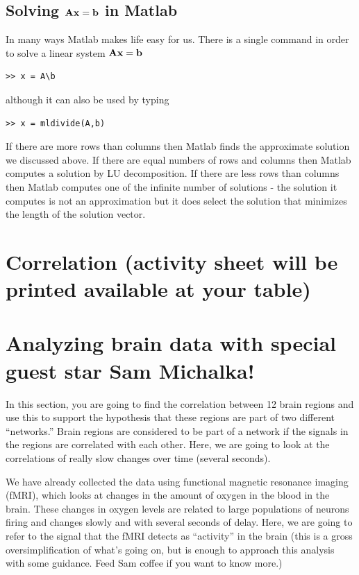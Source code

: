\subsection{Solving $\mathbf{A} \mathbf{x} = \mathbf{b}$ in Matlab}

In many ways Matlab makes life easy for us. There is a single command in order to solve a linear system $\mathbf{A} \mathbf{x} = \mathbf{b}$
\begin{verbatim}
>> x = A\b
\end{verbatim}
although it can also be used by typing
\begin{verbatim}
>> x = mldivide(A,b)
\end{verbatim}
If there are more rows than columns then Matlab finds the approximate solution we discussed above. If there are equal numbers of rows and columns then Matlab computes a solution by LU decomposition. If there are less rows than columns then Matlab computes one of the infinite number of solutions - the solution it computes is not an approximation but it does select the solution that minimizes the length of the solution vector.

\section{Correlation (activity sheet will be printed available at your table)}

\section{Analyzing brain data with special guest star Sam Michalka!}

In this section, you are going to find the correlation between 12 brain regions and use this to support the hypothesis that these regions are part of two different ``networks.'' Brain regions are considered to be part of a network if the signals in the regions are correlated with each other. Here, we are going to look at the correlations of really slow changes over time (several seconds).

We have already collected the data using functional magnetic resonance imaging (fMRI), which looks at changes in the amount of oxygen in the blood in the brain. These changes in oxygen levels are related to large populations of neurons firing and changes slowly and with several seconds of delay.  Here, we are going to refer to the signal that the fMRI detects as ``activity'' in the brain (this is a gross oversimplification of what's going on, but is enough to approach this analysis with some guidance.  Feed Sam coffee if you want to know more.)

